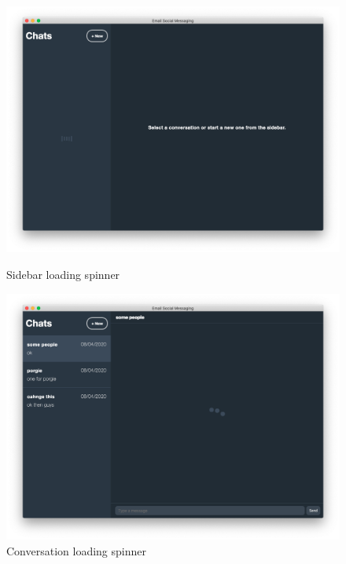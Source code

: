 \begin{figure}[h!]
  \centering
  \begin{minipage}{0.5\textwidth}
      \centering
      \includegraphics[width=\textwidth]{images/loading1.png} %
      \caption{Sidebar loading spinner}
      \label{fig:loading1}
  \end{minipage}\hfill
  \begin{minipage}{0.5\textwidth}
      \centering
      \includegraphics[width=\textwidth]{images/loading2.png} %
      \caption{Conversation loading spinner}
      \label{fig:loading2}
  \end{minipage}
\end{figure}

